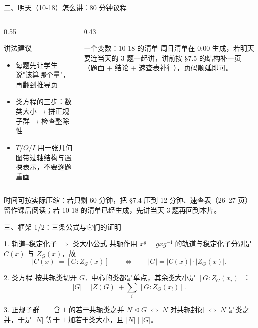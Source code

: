 \documentclass[aspectratio=169,10pt,fontset=none]{ctexbeamer}
\begin{document}
\begin{frame}[t]{二、明天（10-18）怎么讲：80 分钟议程}
  \vspace{0.5em}
  \raggedright
  \begin{columns}[T,onlytextwidth]
    \begin{column}{0.55\textwidth}
      \begin{block}{\footnotesize 讲法建议}
        \scriptsize
        \begin{itemize}\setlength{\itemsep}{1pt}
          \item 每题先让学生说"该算哪个量"，再翻到推导页
          \item 类方程的三步：数类大小 → 拼正规子群 → 检查整除性
          \item $T/O/I$ 用一张几何图带过轴结构与置换表示，不要逐题重画
        \end{itemize}
      \end{block}
    \end{column}
    \begin{column}{0.43\textwidth}
      \begin{alertblock}{\footnotesize 一个变数：10-18 的清单}
        \scriptsize
        周日清单在 0:00 生成，若明天要连当天的 3 题一起讲，讲前按 \S7.5 的结构补一页（题面 + 结论 + 速查表补行），页码顺延即可。
      \end{alertblock}
    \end{column}
  \end{columns}
  \vspace{0.3em}

  {\scriptsize\color{ink!70} 时间可按实际压缩：若只剩 60 分钟，把 \S7.4 压到 12 分钟、速查表（26--27 页）留作课后阅读；若 10-18 的清单已经生成，先讲当天 3 题再回到本片。}
\end{frame}

\begin{frame}[t]{三、框架 1/2：三条公式与它们的证明}
  \begin{block}{1. 轨道--稳定化子 $\Rightarrow$ 类大小公式}
    \footnotesize
    共轭作用 $x^g=gxg^{-1}$ 的轨道与稳定化子分别是 $C(x)$ 与 $Z_G(x)$，故
    \[ |C(x)|=[G:Z_G(x)]\qquad\Longleftrightarrow\qquad |G|=|C(x)|\cdot|Z_G(x)|. \]
  \end{block}
  \begin{block}{2. 类方程}
    \footnotesize
    按共轭类切开 $G$，中心的类都是单点，其余类大小是 $[G:Z_G(x_i)]$：
    \[ |G|=|Z(G)|+\sum_{i}\,[G:Z_G(x_i)]. \]
  \end{block}
  \begin{block}{3. 正规子群 $=$ 含 $1$ 的若干共轭类之并}
    \footnotesize
    $N\trianglelefteq G$ $\iff$ $N$ 对共轭封闭 $\iff$ $N$ 是类之并，于是 $|N|$ 等于 $1$ 加若干类大小，且 $|N|\mid|G|$。
  \end{block}
\end{frame}
\end{document}
